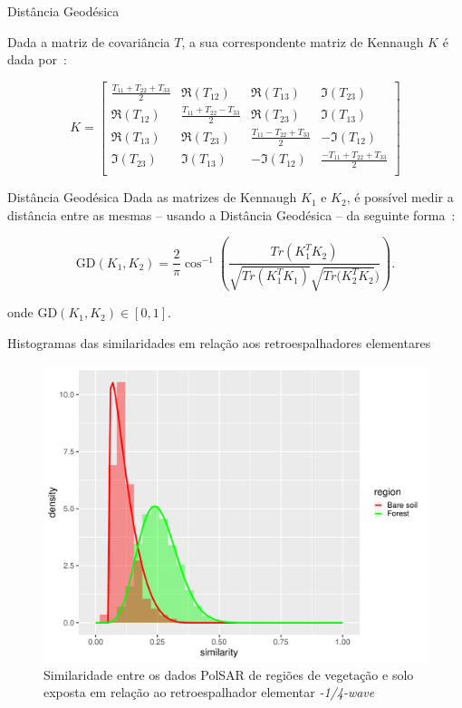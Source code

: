\documentclass{beamer} %
\begin{document}
\begin{frame}{Distância Geodésica}

Dada a matriz de covariância $T$, a sua correspondente matriz de Kennaugh $K$ é dada por~\cite{ClassificationPolSARGeodesic}:


\scriptsize
\begin{equation}
K =
\begin{bmatrix}
\frac{ T_{11} + T_{22} + T_{33} }{2} & \Re(T_{12}) & \Re(T_{13}) & \Im(T_{23})\\
\Re(T_{12}) & \frac{T_{11} + T_{22} - T_{33}}{2} & \Re(T_{23}) & \Im(T_{13})\\
\Re(T_{13}) & \Re(T_{23}) & \frac{ T_{11} - T_{22} + T_{33} }{2} & -\Im(T_{12})\\
\Im(T_{23}) & \Im(T_{13}) & -\Im(T_{12}) & \frac{ -T_{11} + T_{22} + T_{33} }{2}\\
\end{bmatrix}
\end{equation}

\normalsize
    
\end{frame}

\begin{frame}{Distância Geodésica}
    Dada as matrizes de Kennaugh $K_1$ e $K_2$, é possível medir a distância entre as mesmas -- usando a Distância Geodésica -- da seguinte forma~\cite{ClassificationPolSARGeodesic}:
    
\begin{equation}
\text{GD}(K_1, K_2) = \frac{2}{\pi} \cos^{-1} \left(\frac{Tr(K_1^T K_2)}{\sqrt{Tr(K_1^T K_1)} \sqrt{Tr(K_2^T K_2})} \right).
\end{equation}

onde $\text{GD}(K_1, K_2) \in [0,1]$.
    
\end{frame}

\begin{frame}{Histogramas das similaridades em relação aos retroespalhadores elementares}

\begin{figure}
    \centering
    \includegraphics[width = .6\linewidth]{wvn.pdf}
    \caption{Similaridade entre os dados PolSAR de regiões de vegetação e solo exposta em relação ao retroespalhador elementar \textit{-1/4-wave}}
    \label{fig:wvn}
\end{figure}
    
\end{frame}
\end{document}
